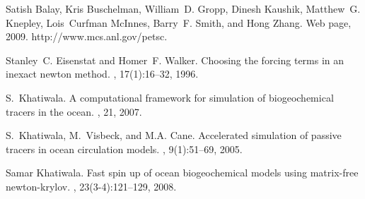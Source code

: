 \begin{thebibliography}{1}

Satish Balay, Kris Buschelman, William~D. Gropp, Dinesh Kaushik, Matthew~G.
  Knepley, Lois~Curfman McInnes, Barry~F. Smith, and Hong Zhang.
 {W}eb page, 2009.
\newblock http://www.mcs.anl.gov/petsc.

Stanley~C. Eisenstat and Homer~F. Walker.
\newblock Choosing the forcing terms in an inexact newton method.
, 17(1):16--32, 1996.

S.~Khatiwala.
\newblock A computational framework for simulation of biogeochemical tracers in
  the ocean.
, 21, 2007.

S.~Khatiwala, M.~Visbeck, and M.A. Cane.
\newblock Accelerated simulation of passive tracers in ocean circulation
  models.
, 9(1):51--69, 2005.

Samar Khatiwala.
\newblock Fast spin up of ocean biogeochemical models using matrix-free
  newton-krylov.
, 23(3-4):121--129, 2008.

\end{thebibliography}
